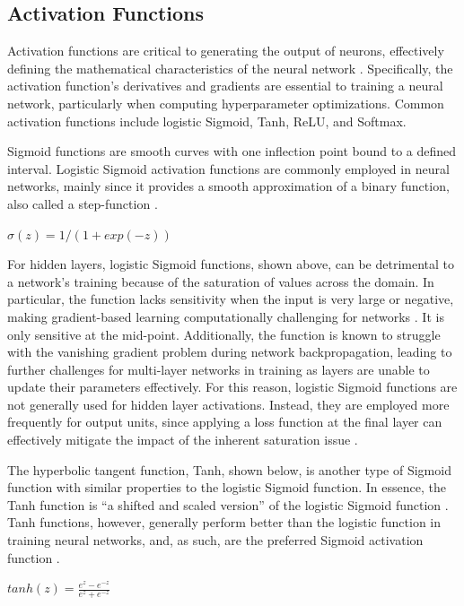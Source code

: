 \documentclass{article}
\begin{document}
\subsection{Activation Functions}
Activation functions are critical to generating the output of neurons, effectively defining the mathematical characteristics of the neural network \cite{lederer2021activation}. Specifically, the activation function’s derivatives and gradients are essential to training a neural network, particularly when computing hyperparameter optimizations. Common activation functions include logistic Sigmoid, Tanh, ReLU, and Softmax.

Sigmoid functions are smooth curves with one inflection point bound to a defined interval. Logistic Sigmoid activation functions are commonly employed in neural networks, mainly since it provides a smooth approximation of a binary function, also called a step-function \cite{lederer2021activation}. 
\newline
\newline
\centerline{$\sigma(z)=1/(1+exp(-z))$ \cite{lederer2021activation}}
\newline

For hidden layers, logistic Sigmoid functions, shown above, can be detrimental to a network’s training because of the saturation of values across the domain. In particular, the function lacks sensitivity when the input is very large or negative, making gradient-based learning computationally challenging for networks \cite{Goodfellow-et-al-2016}. It is only sensitive at the mid-point. Additionally, the function is known to struggle with the vanishing gradient problem during network backpropagation, leading to further challenges for multi-layer networks in training as layers are unable to update their parameters effectively. For this reason, logistic Sigmoid functions are not generally used for hidden layer activations. Instead, they are employed more frequently for output units, since applying a loss function at the final layer can effectively mitigate the impact of the inherent saturation issue \cite{Goodfellow-et-al-2016}. 

The hyperbolic tangent function, Tanh, shown below, is another type of Sigmoid function with similar properties to the logistic Sigmoid function. In essence, the Tanh function is “a shifted and scaled version” of the logistic Sigmoid function \cite{lederer2021activation}. Tanh functions, however, generally perform better than the logistic function in training neural networks, and, as such, are the preferred Sigmoid activation function \cite{Goodfellow-et-al-2016}. 
\newline
\newline
\centerline{$tanh(z) = \frac{e^{z} - e^{-z}}{e^{z} + e^{-z}}$ \cite{lederer2021activation}}
\newline
\end{document}
